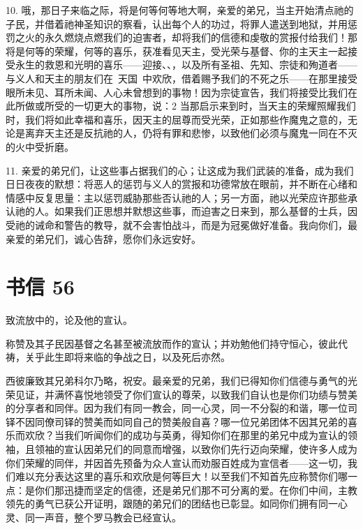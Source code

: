 10. 哦，那日子来临之际，将是何等何等地大啊，亲爱的弟兄，当主开始清点祂的子民，并借着祂神圣知识的察看，认出每个人的功过，将罪人遣送到地狱，并用惩罚之火的永久燃烧点燃我们的迫害者，却将我们的信德和虔敬的赏报付给我们！那将是何等的荣耀，何等的喜乐，获准看见天主，受光荣与基督、你的主天主一起接受永生的救恩和光明的喜乐——迎接、、，以及所有圣祖、先知、宗徒和殉道者——与义人和天主的朋友们在~天国~中欢欣，借着赐予我们的不死之乐——在那里接受眼所未见、耳所未闻、人心未曾想到的事物！因为宗徒宣告，我们将接受比我们在此所做或所受的一切更大的事物，说：2 当那启示来到时，当天主的荣耀照耀我们时，我们将如此幸福和喜乐，因天主的屈尊而受光荣，正如那些作魔鬼之意的，无论是离弃天主还是反抗祂的人，仍将有罪和悲惨，以致他们必须与魔鬼一同在不灭的火中受折磨。\par

11. 亲爱的弟兄们，让这些事占据我们的心；让这成为我们武装的准备，成为我们日日夜夜的默想：将恶人的惩罚与义人的赏报和功德常放在眼前，并不断在心绪和情感中反复思量：主以惩罚威胁那些否认祂的人；另一方面，祂以光荣应许那些承认祂的人。如果我们正思想并默想这些事，而迫害之日来到，那么基督的士兵，因受祂的诫命和警告的教导，就不会害怕战斗，而是为冠冕做好准备。我向你们，最亲爱的弟兄们，诚心告辞，愿你们永远安好。\par



\section{书信 56}

致流放中的，论及他的宣认。\par

称赞及其子民因基督之名甚至被流放而作的宣认；并劝勉他们持守恒心，彼此代祷，关乎此生即将来临的争战之日，以及死后亦然。\par

西彼廉致其兄弟科尔乃略，祝安。最亲爱的兄弟，我们已得知你们信德与勇气的光荣见证，并满怀喜悦地领受了你们宣认的尊荣，以致我们自认也是你们功绩与赞美的分享者和同伴。因为我们有同一教会，同一心灵，同一不分裂的和谐，哪一位司铎不因同僚司铎的赞美而如同自己的赞美般自喜？哪一位兄弟团体不因其兄弟的喜乐而欢欣？当我们听闻你们的成功与英勇，得知你们在那里的弟兄中成为宣认的领袖，且领袖的宣认因弟兄们的同意而增强，以致你们先行迈向荣耀，使许多人成为你们荣耀的同伴，并因首先预备为众人宣认而劝服百姓成为宣信者——这一切，我们难以充分表达这里的喜乐和欢欣是何等巨大！以至我们不知首先应称赞你们哪一点：是你们那迅捷而坚定的信德，还是弟兄们那不可分离的爱。在你们中间，主教领先的勇气已获公开证明，跟随的弟兄们的团结也已彰显。如同你们拥有同一心灵、同一声音，整个罗马教会已经宣认。\par

